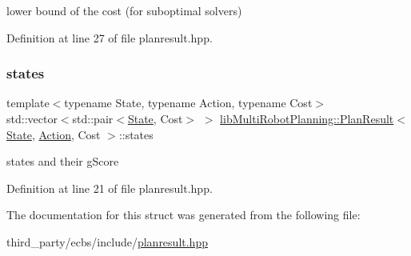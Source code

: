 lower bound of the cost (for suboptimal solvers) 



Definition at line 27 of file planresult.\+hpp.

\mbox{\label{structlib_multi_robot_planning_1_1_plan_result_ad1bd2882efca968d38165742bae0a511}} 
\subsubsection{\texorpdfstring{states}{states}}
{\footnotesize\ttfamily template$<$typename State, typename Action, typename Cost$>$ \\
std\+::vector$<$std\+::pair$<$\hyperlink{structlib_multi_robot_planning_1_1_state}{State}, Cost$>$ $>$ \hyperlink{structlib_multi_robot_planning_1_1_plan_result}{lib\+Multi\+Robot\+Planning\+::\+Plan\+Result}$<$ \hyperlink{structlib_multi_robot_planning_1_1_state}{State}, \hyperlink{namespacelib_multi_robot_planning_aba73fb71693f86a324adfa0e41e1053d}{Action}, Cost $>$\+::states}



states and their g\+Score 



Definition at line 21 of file planresult.\+hpp.



The documentation for this struct was generated from the following file\+:\begin{DoxyCompactItemize}
\item 
third\+\_\+party/ecbs/include/\hyperlink{planresult_8hpp}{planresult.\+hpp}\end{DoxyCompactItemize}

